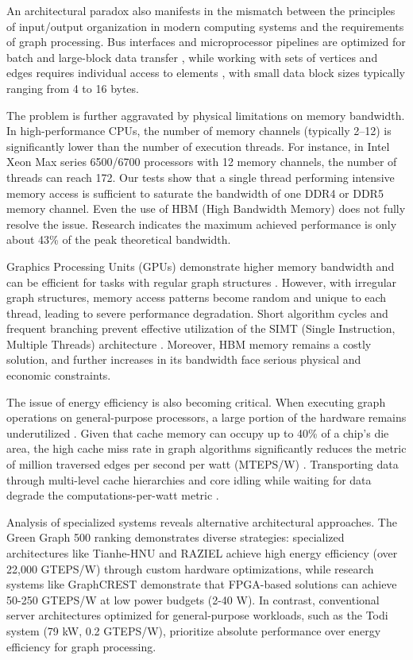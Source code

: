 An architectural paradox also manifests in the mismatch between the principles of input/output organization in modern computing systems and the requirements of graph processing. Bus interfaces and microprocessor pipelines are optimized for batch and large-block data transfer \cite{QianWeiXiangXiaoAPerformance2021}, while working with sets of vertices and edges requires individual access to elements \cite{PIUMA2020}, with small data block sizes typically ranging from 4 to 16 bytes.

The problem is further aggravated by physical limitations on memory bandwidth. In high-performance CPUs, the number of memory channels (typically 2–12) is significantly lower than the number of execution threads. For instance, in Intel Xeon Max series 6500/6700 processors with 12 memory channels, the number of threads can reach 172. Our tests show that a single thread performing intensive memory access is sufficient to saturate the bandwidth of one DDR4 or DDR5 memory channel. Even the use of HBM (High Bandwidth Memory) does not fully resolve the issue. Research \cite{McCaplinBandwithLimits2023} indicates the maximum achieved performance is only about 43\% of the peak theoretical bandwidth.

Graphics Processing Units (GPUs) demonstrate higher memory bandwidth and can be efficient for tasks with regular graph structures \cite{AasawatHowWell2018}. However, with irregular graph structures, memory access patterns become random and unique to each thread, leading to severe performance degradation. Short algorithm cycles and frequent branching prevent effective utilization of the SIMT (Single Instruction, Multiple Threads) architecture \cite{GridGAS2018}. Moreover, HBM memory remains a costly solution, and further increases in its bandwidth face serious physical and economic constraints.


The issue of energy efficiency is also becoming critical. When executing graph operations on general-purpose processors, a large portion of the hardware remains underutilized \cite{XuGraphprocessingonGPU2014}. Given that cache memory can occupy up to 40\% of a chip's die area, the high cache miss rate in graph algorithms significantly reduces the metric of million traversed edges per second per watt (MTEPS/W) \cite{GreenGraph500}. Transporting data through multi-level cache hierarchies and core idling while waiting for data degrade the computations-per-watt metric \cite{zhouHighThroughputEnergyEfficientGraph2016}.

Analysis of specialized systems reveals alternative architectural approaches. The Green Graph 500 ranking demonstrates diverse strategies: specialized architectures like Tianhe-HNU and RAZIEL achieve high energy efficiency (over 22,000 GTEPS/W) through custom hardware optimizations, while research systems like GraphCREST demonstrate that FPGA-based solutions can achieve 50-250 GTEPS/W at low power budgets (2-40 W). In contrast, conventional server architectures optimized for general-purpose workloads, such as the Todi system (79 kW, 0.2 GTEPS/W), prioritize absolute performance over energy efficiency for graph processing.

